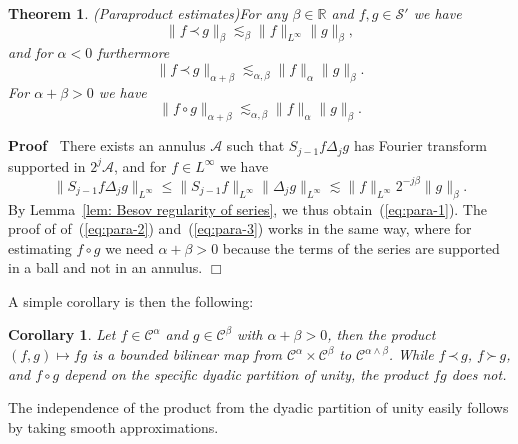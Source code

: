 \documentclass[a4paper,11pt]{article}
\newenvironment{proof}{\noindent\textbf{Proof\ }}{\hspace*{\fill}$\Box$\medskip}
\newtheorem{corollary}{Corollary}
\newtheorem{theorem}{Theorem}
\newcommand{\CA}{\mathscr{A}}
\newcommand{\CS}{\mathscr{S}}
\newcommand{\CC}{\mathscr{C}}
\newcommand{\lpara}{\,\mathord{\prec}\,}
\newcommand{\rpara}{\,\mathord{\succ}\,}
\newcommand{\reso}{\,\mathord{\circ}\,}
\begin{document}
\begin{theorem}
  (Paraproduct estimates)\label{thm:paraproduct} For any $\beta \in
  \mathbb{R}$ and $f, g \in \CS'$ we have
  \begin{equation}
    \label{eq:para-1} \|f \lpara g\|_{\beta} \lesssim_{\beta}
    \|f\|_{L^{\infty}} \|g\|_{\beta},
  \end{equation}
  and for $\alpha < 0$ furthermore
  \begin{equation}
    \label{eq:para-2} \|f \lpara g\|_{\alpha + \beta} \lesssim_{\alpha, \beta}
    \|f\|_{\alpha} \|g\|_{\beta} .
  \end{equation}
  For $\alpha + \beta > 0$ we have
  \begin{equation}
    \label{eq:para-3} \|f \reso g\|_{\alpha + \beta} \lesssim_{\alpha, \beta}
    \|f\|_{\alpha} \|g\|_{\beta} .
  \end{equation}
\end{theorem}

\begin{proof}
  There exists an annulus $\CA$ such that $S_{j - 1} f \Delta_j g$ has Fourier
  transform supported in $2^j \CA$, and for $f \in L^{\infty}$ we have
  \[ \|S_{j - 1} f \Delta_j g\|_{L^{\infty}} \leqslant \|S_{j - 1}
     f\|_{L^{\infty}}  \| \Delta_j g\|_{L^{\infty}} \lesssim
     \|f\|_{L^{\infty}} 2^{- j \beta} \|g\|_{\beta} . \]
  By Lemma~\ref{lem: Besov regularity of series}, we thus
  obtain~(\ref{eq:para-1}). The proof of of~(\ref{eq:para-2})
  and~(\ref{eq:para-3}) works in the same way, where for estimating $f \reso
  g$ we need $\alpha + \beta > 0$ because the terms of the series are
  supported in a ball and not in an annulus.
\end{proof}

A simple corollary is then the following:

\begin{corollary}
  \label{cor:product}Let $f \in \CC^{\alpha}$ and $g \in \CC^{\beta}$ with
  $\alpha + \beta > 0$, then the product $(f, g) \mapsto fg$ is a bounded
  bilinear map from $\CC^{\alpha} \times \CC^{\beta}$ to $\CC^{\alpha \wedge
  \beta}$. While $f \lpara g$, $f \rpara g$, and $f \reso g$ depend on the
  specific dyadic partition of unity, the product $f g$ does not.
\end{corollary}

The independence of the product from the dyadic partition of unity easily
follows by taking smooth approximations.

\
\end{document}
